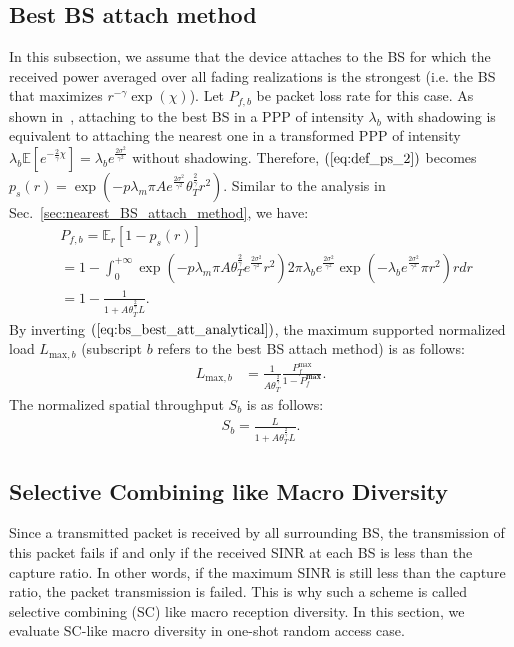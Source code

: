 \subsection{Best BS attach method}
In this subsection, we assume that the device attaches to the BS for which the received power averaged over all fading realizations is the strongest (i.e. the BS that maximizes $r^{-\gamma}\exp(\chi)$). Let $P_{f,b} $ be packet loss rate for this case. As shown in~\cite[lemma 1]{dhillon2014downlink},  attaching to the best BS in a PPP of intensity $\lambda_{b}$ with shadowing is equivalent to attaching the nearest one in a transformed PPP of intensity $\lambda_{b} \mathbb{E}\left[ e^{-\frac{2}{\gamma}\chi}\right] = \lambda_{b} e^{\frac{2\sigma^2}{\gamma^2}}$ without shadowing. 
Therefore, $(\ref{eq:def_ps_2})$ 
becomes $p_{s}(r) = \exp(-p \lambda_{m} \pi A e^{\frac{2\sigma^2}{\gamma^2}} \theta_{T}^{\frac{2}{\gamma}} r^2 )$. Similar to the analysis in Sec.~\ref{sec:nearest_BS_attach_method}, we have:
\begin{align}
\label{eq:bs_best_att_analytical}
&P_{f,b}= \mathbb{E}_{r}\left[ 1-p_{s}\left(r\right) \right]  \nonumber\\
&= 1 -\int_{0}^{+\infty}  \exp(-p \lambda_{m} \pi A \theta_{T}^{\frac{2}{\gamma}} e^{\frac{2\sigma^2}{\gamma^2}}  r^2 )  2 \pi \lambda_b e^{\frac{2\sigma^2}{\gamma^2}}  \exp( -\lambda_b  e^{\frac{2\sigma^2}{\gamma^2}} \pi r^2 ) r dr \nonumber\\
&= 1-\frac{1}{ 1 +  A \theta_{T}^{\frac{2}{\gamma}} L }.
\end{align}By inverting $(\ref{eq:bs_best_att_analytical})$, the maximum supported normalized load $L_{\text{max}, b}$ (subscript $b$ refers to the best BS attach method) is as follows:
\begin{align}
	L_{\text{max},b} &=\frac{1}{A \theta_{T}^{\frac{2}{\gamma}}  } 
	\frac{P_{f}^{\text{max}}}{1 - P_{f}^{\textbf{max}}}. 
\end{align}
The normalized spatial throughput $S_{b}$ is as follows:
\begin{align}
	S_{b} =  \frac{L}{1 +  A  \theta_{T}^{\frac{2}{\gamma}} L }.
\end{align}

\subsection{Selective Combining like Macro Diversity}
Since a transmitted packet is received by all surrounding BS, the transmission of this packet fails if and only if the received SINR at each BS is less than the capture ratio. In other words, if the maximum SINR is still less than the capture ratio, the packet transmission is failed. This is why such a scheme is called selective combining (SC) like macro reception diversity. In this section, we evaluate SC-like macro diversity in one-shot random access case.

